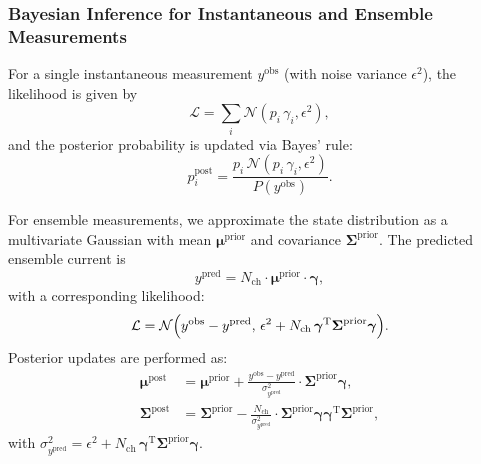 \documentclass[pdflatex,sn-mathphys-num]{sn-jnl}%
\theoremstyle{thmstyleone}%
\theoremstyle{thmstyletwo}%
\theoremstyle{thmstylethree}%
\begin{document}
\subsubsection{Bayesian Inference for Instantaneous and Ensemble Measurements}
For a single instantaneous measurement \(y^{\text{obs}}\) (with noise variance \(\epsilon^2\)), the likelihood is given by
\begin{equation}
	\mathcal{L} = \sum_i \mathcal{N}(p_i\,\gamma_i, \epsilon^2),
	\label{eq:single_channel_likelihood_short}
\end{equation}
and the posterior probability is updated via Bayes' rule:
\begin{equation}
	p_i^{\text{post}} = \frac{p_i\, \mathcal{N}(p_i\,\gamma_i,\epsilon^2)}{P(y^{\text{obs}})}.
	\label{eq:single_channel_posterior_short}
\end{equation}

For ensemble measurements, we approximate the state distribution as a multivariate Gaussian with mean \(\boldsymbol{\mu}^{\text{prior}}\) and covariance \(\boldsymbol{\Sigma}^{\text{prior}}\). The predicted ensemble current is
\begin{equation}
	y^{\text{pred}} = N_{\text{ch}} \cdot \boldsymbol{\mu}^{\text{prior}} \cdot \boldsymbol{\gamma},
	\label{eq:macro_predicted_y_short}
\end{equation}
with a corresponding likelihood:
\begin{equation}
	\mathcal{L} = \mathcal{N}\Bigl(y^{\text{obs}} - y^{\text{pred}},\, \epsilon^2 + N_{\text{ch}}\, \boldsymbol{\gamma}^{\mathrm{T}}\boldsymbol{\Sigma}^{\text{prior}}\boldsymbol{\gamma}\Bigr).
	\label{eq:macro_likelihood_short}
\end{equation}
Posterior updates are performed as:
\begin{align}
	\boldsymbol{\mu}^{\text{post}} &= \boldsymbol{\mu}^{\text{prior}} + \frac{y^{\text{obs}}-y^{\text{pred}}}{\sigma^2_{y^{\text{pred}}}} \cdot \boldsymbol{\Sigma}^{\text{prior}}\boldsymbol{\gamma}, \label{eq:macro_mean_post_short} \\
	\boldsymbol{\Sigma}^{\text{post}} &= \boldsymbol{\Sigma}^{\text{prior}} - \frac{N_{\text{ch}}}{\sigma^2_{y^{\text{pred}}}} \cdot \boldsymbol{\Sigma}^{\text{prior}}\boldsymbol{\gamma}\boldsymbol{\gamma}^{\mathrm{T}}\boldsymbol{\Sigma}^{\text{prior}},
	\label{eq:macro_cov_post_short}
\end{align}
with \(\sigma^2_{y^{\text{pred}}} = \epsilon^2 + N_{\text{ch}}\, \boldsymbol{\gamma}^{\mathrm{T}}\boldsymbol{\Sigma}^{\text{prior}}\boldsymbol{\gamma}\).
\end{document}
